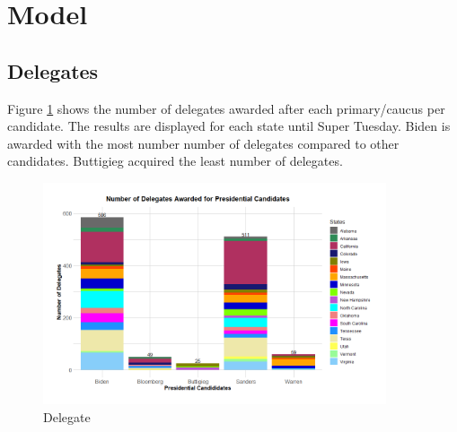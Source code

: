 
\section{Model}\label{model}
\subsection{Delegates}
Figure \ref{Delegate} shows the number of delegates awarded after each primary/caucus per candidate. The results are displayed for each state until Super Tuesday. Biden is awarded with the most number number of delegates compared to other candidates. Buttigieg acquired the least number of delegates. 
\begin{figure}[H]
    \centering
    \includegraphics[width=0.9\textwidth]{figures/Delegate.png}
    \caption{Delegate}
    \label{Delegate}
\end{figure}

